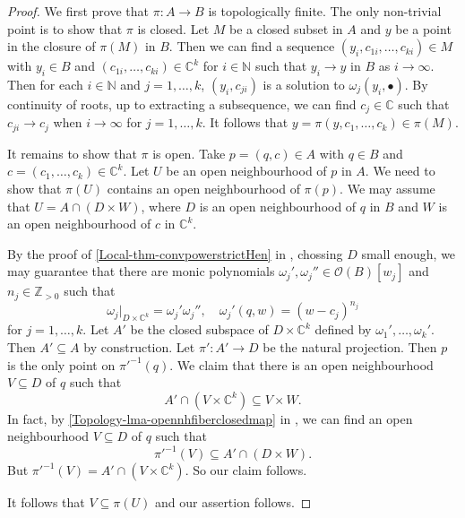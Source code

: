 \begin{proof}
    We first prove that $\pi:A\rightarrow B$ is topologically finite. The only non-trivial point is to show that $\pi$ is closed. Let $M$ be a closed subset in $A$ and $y$ be a point in the closure of $\pi(M)$ in $B$.  Then we can find a sequence $(y_i,c_{1i},\ldots,c_{ki})\in M$ with $y_i\in B$ and $(c_{1i},\ldots,c_{ki})\in \mathbb{C}^k$
    for $i\in \mathbb{N}$ such that $y_i\to y$ in $B$ as $i\to\infty$. Then for each $i\in \mathbb{N}$ and $j=1,\ldots,k$, $(y_i,c_{ji})$ is a solution to $\omega_j(y_i,\bullet)$. By continuity of roots, up to extracting a subsequence, we can find $c_j\in \mathbb{C}$ such that $c_{ji}\to c_j$ when $i\to\infty$  for $j=1,\ldots,k$. It follows that $y=\pi(y,c_1,\ldots,c_k)\in \pi(M)$.

    It remains to show that $\pi$ is open. Take $p=(q,c)\in A$ with $q\in B$ and $c=(c_1,\ldots,c_k)\in \mathbb{C}^k$.  Let $U$ be an open neighbourhood of $p$ in $A$. We need to show that $\pi(U)$ contains an open neighbourhood of $\pi(p)$. We may assume that $U=A\cap (D\times W)$, where $D$ is an open neighbourhood of $q$ in $B$ and $W$ is an open neighbourhood of  $c$ in $\mathbb{C}^k$.

    By the proof of \cref{Local-thm-convpowerstrictHen} in , chossing $D$ small enough, we may guarantee that there are monic polynomials $\omega_j',\omega_j''\in \mathcal{O}(B)[w_j]$ and $n_j\in \mathbb{Z}_{>0}$ such that 
    \[
        \omega_j|_{D\times \mathbb{C}^k}=\omega_j'\omega_j'',\quad \omega_j'(q,w)=(w-c_j)^{n_j}
    \]
    for $j=1,\ldots,k$. Let $A'$ be the closed subspace of $D\times \mathbb{C}^k$ defined by $\omega_1',\ldots,\omega_k'$. Then $A'\subseteq A$ by construction.  Let $\pi':A'\rightarrow D$ be the natural projection. Then $p$ is the only point on $\pi'^{-1}(q)$. We claim that there is an open neighbourhood $V\subseteq D$ of $q$ such that
    \[
        A'\cap (V\times \mathbb{C}^k)\subseteq V\times W.
    \]
    In fact, by \cref{Topology-lma-opennhfiberclosedmap} in , we can find an open neighbourhood $V\subseteq D$ of $q$ such that
    \[
        \pi'^{-1}(V)\subseteq A'\cap (D\times W).
    \]
    But $\pi'^{-1}(V)=A'\cap (V\times \mathbb{C}^k)$. So our claim follows.

    It follows that $V\subseteq \pi(U)$ and our assertion follows.
\end{proof}

